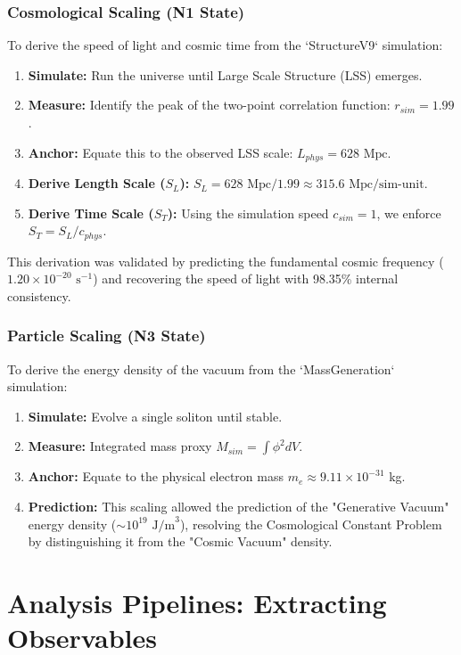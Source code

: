 \documentclass[11pt, twoside]{article}
\begin{document}
\subsubsection{Cosmological Scaling (N1 State)}
To derive the speed of light and cosmic time from the `StructureV9` simulation:
\begin{enumerate}
    \item \textbf{Simulate:} Run the universe until Large Scale Structure (LSS) emerges.
    \item \textbf{Measure:} Identify the peak of the two-point correlation function: $r_{sim} = 1.99$.
    \item \textbf{Anchor:} Equate this to the observed LSS scale: $L_{phys} = 628 \text{ Mpc}$.
    \item \textbf{Derive Length Scale ($S_L$):} $S_L = 628 \text{ Mpc} / 1.99 \approx 315.6 \text{ Mpc/sim-unit}$.
    \item \textbf{Derive Time Scale ($S_T$):} Using the simulation speed $c_{sim}=1$, we enforce $S_T = S_L / c_{phys}$.
\end{enumerate}
This derivation was validated by predicting the fundamental cosmic frequency ($1.20 \times 10^{-20} \text{ s}^{-1}$) and recovering the speed of light with 98.35\% internal consistency.

\subsubsection{Particle Scaling (N3 State)}
To derive the energy density of the vacuum from the `MassGeneration` simulation:
\begin{enumerate}
    \item \textbf{Simulate:} Evolve a single soliton until stable.
    \item \textbf{Measure:} Integrated mass proxy $M_{sim} = \int \phi^2 dV$.
    \item \textbf{Anchor:} Equate to the physical electron mass $m_e \approx 9.11 \times 10^{-31}$ kg.
    \item \textbf{Prediction:} This scaling allowed the prediction of the "Generative Vacuum" energy density ($\sim 10^{19} \text{ J/m}^3$), resolving the Cosmological Constant Problem by distinguishing it from the "Cosmic Vacuum" density.
\end{enumerate}

\section{Analysis Pipelines: Extracting Observables}
\end{document}
